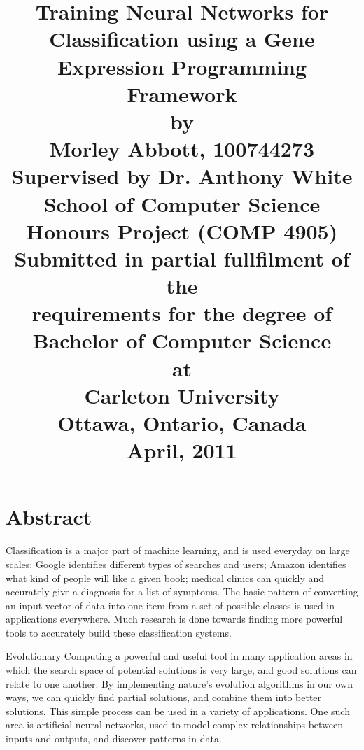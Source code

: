 \documentclass[a4paper,11pt]{report}
\begin{document}
\title{
\huge{\textbf{Training Neural Networks for Classification using a Gene Expression Programming Framework}}\\[1.4cm]
\large{by}\\[0.2cm]
\large{Morley Abbott, 100744273} \\[1.4cm]
\large{Supervised by Dr. Anthony White} \\[0.2cm]
\large{School of Computer Science}\\[1.4cm]
\large{Honours Project (COMP 4905)} \\[0.2cm]
\large{Submitted in partial fullfilment of the} \\[0.2cm]
\large{requirements for the degree of } \\[0.2cm]
\large{Bachelor of Computer Science} \\[1.4cm]
\large{at}\\[1.4cm]
\large{Carleton University} \\[0.2cm]
\large{Ottawa, Ontario, Canada} \\[0.2cm]
\large{April, 2011} \\[0.2cm]}
\author{} \date{}

\maketitle
\setcounter{tocdepth}{1}


\chapter*{Abstract}

Classification is a major part of machine learning, and is used everyday on large scales:
Google identifies different types of searches and users; Amazon identifies
what kind of people will like a given book; medical clinics can quickly and accurately 
give a diagnosis for a list of symptoms. The basic pattern of converting an input vector 
of data into one item from a set of possible classes is used in applications everywhere. 
Much research is done towards finding more powerful tools to accurately build these classification 
systems.

Evolutionary Computing a powerful and useful tool in many application 
areas in which the search space of potential solutions is very large, and good solutions
can relate to one another. By implementing nature's evolution algorithms in our own ways, we can quickly 
find partial solutions, and combine them into better solutions. This simple process can be 
used in a variety of applications. One such area is artificial neural networks, used to model complex
relationships between inputs and outputs, and discover patterns in data.
\end{document}
